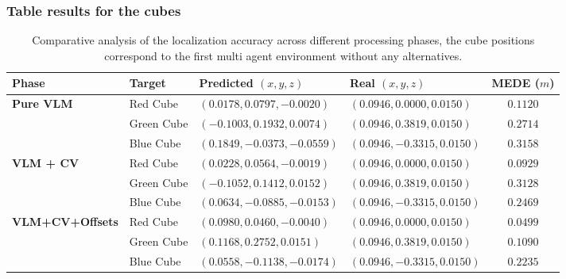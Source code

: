 \subsubsection{Table results for the cubes}
\begin{table}[H]
	\centering
	\small
	\begin{tabularx}{\textwidth}{l l X X c}
		\toprule
		\textbf{Phase} & \textbf{Target} & \textbf{Predicted $(x, y, z)$} & \textbf{Real $(x, y, z)$} & \textbf{MEDE ($m$)} \\
		\midrule
		\textbf{Pure VLM} 
		& Red Cube   & $(0.0178, 0.0797, -0.0020)$ & $(0.0946, 0.0000, 0.0150)$ & $0.1120$ \\
		& Green Cube & $(-0.1003, 0.1932, 0.0074)$ & $(0.0946, 0.3819, 0.0150)$ & $0.2714$ \\
		& Blue Cube  & $(0.1849, -0.0373, -0.0559)$ & $(0.0946, -0.3315, 0.0150)$ & $0.3158$ \\
		\midrule
		\textbf{VLM + CV} 
		& Red Cube   & $(0.0228, 0.0564, -0.0019)$ & $(0.0946, 0.0000, 0.0150)$ & $0.0929$ \\
		& Green Cube & $(-0.1052, 0.1412, 0.0152)$ & $(0.0946, 0.3819, 0.0150)$ & $0.3128$ \\
		& Blue Cube  & $(0.0634, -0.0885, -0.0153)$  & $(0.0946, -0.3315, 0.0150)$ & $0.2469$ \\
		\midrule
		\textbf{VLM+CV+Offsets} 
		& Red Cube   & $(0.0980, 0.0460, -0.0040)$  & $(0.0946, 0.0000, 0.0150)$ & $\mathbf{0.0499}$ \\
		& Green Cube & $(0.1168, 0.2752, 0.0151)$  & $(0.0946, 0.3819, 0.0150)$ & $\mathbf{0.1090}$ \\
		& Blue Cube  & $(0.0558, -0.1138, -0.0174)$ & $(0.0946, -0.3315, 0.0150)$ & $\mathbf{0.2235}$ \\
		\bottomrule
	\end{tabularx}
	\caption{Comparative analysis of the localization accuracy across different processing phases, the cube positions correspond to the first multi agent environment without any alternatives.}
	\label{tab:cube_results}
\end{table}

